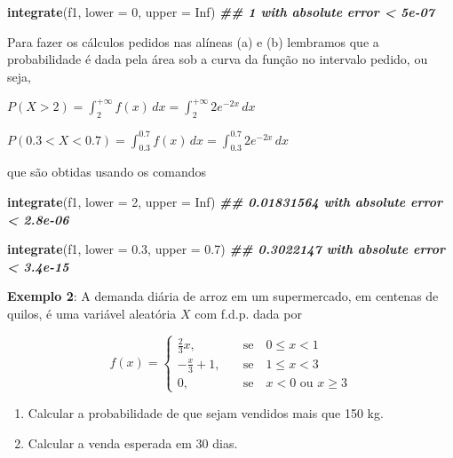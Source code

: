 \documentclass[
]{book}
\newenvironment{Shaded}{\begin{snugshade}}{\end{snugshade}}
\newcommand{\AttributeTok}[1]{\textcolor[rgb]{0.13,0.29,0.53}{#1}}
\newcommand{\ConstantTok}[1]{\textcolor[rgb]{0.56,0.35,0.01}{#1}}
\newcommand{\DecValTok}[1]{\textcolor[rgb]{0.00,0.00,0.81}{#1}}
\newcommand{\DocumentationTok}[1]{\textcolor[rgb]{0.56,0.35,0.01}{\textbf{\textit{#1}}}}
\newcommand{\FloatTok}[1]{\textcolor[rgb]{0.00,0.00,0.81}{#1}}
\newcommand{\FunctionTok}[1]{\textcolor[rgb]{0.13,0.29,0.53}{\textbf{#1}}}
\newcommand{\NormalTok}[1]{#1}
\providecommand{\tightlist}{%
  \setlength{\itemsep}{0pt}\setlength{\parskip}{0pt}}
\begin{document}
\begin{Shaded}
\begin{Highlighting}[]
\FunctionTok{integrate}\NormalTok{(f1, }\AttributeTok{lower =} \DecValTok{0}\NormalTok{, }\AttributeTok{upper =} \ConstantTok{Inf}\NormalTok{)}
\DocumentationTok{\#\# 1 with absolute error \textless{} 5e{-}07}
\end{Highlighting}
\end{Shaded}

Para fazer os cálculos pedidos nas alíneas (a) e (b) lembramos que a probabilidade é dada pela área sob a curva da função no intervalo pedido, ou seja,

\(P(X > 2) = \int_{2}^{+\infty}f(x)\, dx = \int_{2}^{+\infty} 2e^{-2x}\,dx\)

\(P(0.3 < X < 0.7) = \int_{0.3}^{0.7}f(x)\, dx = \int_{0.3}^{0.7} 2e^{-2x}\, dx\)

que são obtidas usando os comandos

\begin{Shaded}
\begin{Highlighting}[]
\FunctionTok{integrate}\NormalTok{(f1, }\AttributeTok{lower =} \DecValTok{2}\NormalTok{, }\AttributeTok{upper =} \ConstantTok{Inf}\NormalTok{)}
\DocumentationTok{\#\# 0.01831564 with absolute error \textless{} 2.8e{-}06}

\FunctionTok{integrate}\NormalTok{(f1, }\AttributeTok{lower =} \FloatTok{0.3}\NormalTok{, }\AttributeTok{upper =} \FloatTok{0.7}\NormalTok{)}
\DocumentationTok{\#\# 0.3022147 with absolute error \textless{} 3.4e{-}15}
\end{Highlighting}
\end{Shaded}

\textbf{Exemplo 2}: A demanda diária de arroz em um supermercado, em centenas de quilos, é uma variável aleatória \(X\) com f.d.p. dada por

\[f(x) = \begin{cases}
\frac{2}{3}x,& \quad \text{se} \quad 0\leq x <1 \\
-\frac{x}{3}+1,& \quad \text{se} \quad 1\leq x<3 \\
0,& \quad \text{se} \quad x<0 \,\, \text{ou} \,\, x\geq 3
\end{cases}\]

\begin{enumerate}
\def\labelenumi{(\alph{enumi})}
\tightlist
\item
  Calcular a probabilidade de que sejam vendidos mais que 150 kg.
\item
  Calcular a venda esperada em 30 dias.
\end{enumerate}
\end{document}
